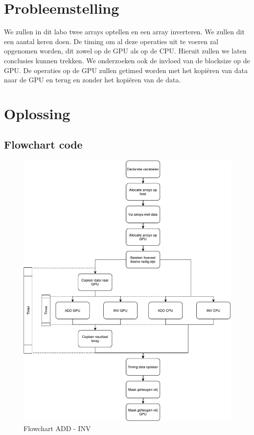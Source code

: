 \documentclass[twoside,a4paper]{article}
\begin{document}
\section{Probleemstelling}
We zullen in dit labo twee arrays optellen en een array inverteren. We zullen dit een aantal keren doen. De timing om al deze operaties uit te voeren zal opgenomen worden, dit zowel op de GPU als op de CPU. Hieruit zullen we laten conclusies kunnen trekken. We onderzoeken ook de invloed van de blocksize op de GPU. De operaties op de GPU zullen getimed worden met het kopi\"eren van data naar de GPU en terug en zonder het kopi\"eren van de data.


\section{Oplossing}

\subsection{Flowchart code}

\begin{figure}[H]
    \centering
    \includegraphics[width=\columnwidth]{flowchart_inv_add.pdf}
    \caption{Flowchart ADD - INV}
    \label{fig:flowchart}
\end{figure}
\end{document}
